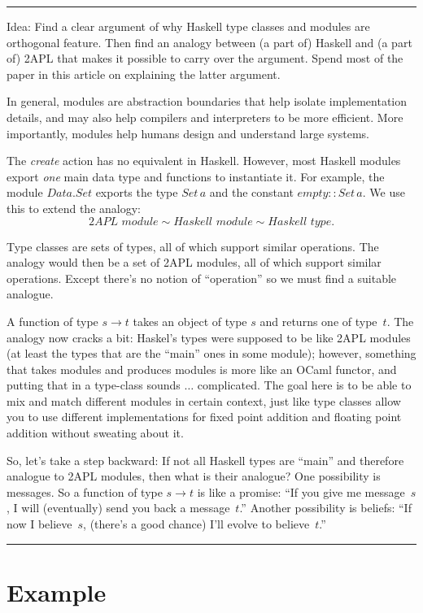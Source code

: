 \documentclass[conference,compsoc]{IEEEtran} %
\newenvironment{notes}{\medskip\hrule\nobreak\smallskip\narrower}{\smallskip\hrule\medskip}
\begin{document}
\begin{notes}
Idea: Find a clear argument of why Haskell type classes and modules are
orthogonal feature. Then find an analogy between (a part of) Haskell and (a
part of) 2APL that makes it possible to carry over the argument. Spend most
of the paper in this article on explaining the latter argument.

In general, modules are abstraction boundaries that help isolate
implementation details, and may also help compilers and interpreters to be
more efficient.  More importantly, modules help humans design and
understand large systems.

The \textit{create} action has no equivalent in Haskell. However, most
Haskell modules export \emph{one} main data type and functions to
instantiate it. For example, the module $\mathit{Data}.\mathit{Set}$
exports the type $\mathit{Set}\,a$ and the constant
$\mathit{empty}::\mathit{Set}\,a$.  We use this to extend the analogy: \[
\textit{2APL module} \sim \textit{Haskell module} \sim \textit{Haskell
type}. \]

Type classes are sets of types, all of which support similar operations.
The analogy would then be a set of 2APL modules, all of which support
similar operations. Except there's no notion of ``operation'' so we must
find a suitable analogue.

A function of type $s\to t$ takes an object of type $s$ and returns one of
type~$t$. The analogy now cracks a bit: Haskel's types were supposed to be
like 2APL modules (at least the types that are the ``main'' ones in some
module); however, something that takes modules and produces modules is more
like an OCaml functor, and putting that in a type-class sounds $\ldots$
complicated. The goal here is to be able to mix and match different modules
in certain context, just like type classes allow you to use different
implementations for fixed point addition and floating point addition
without sweating about it.

So, let's take a step backward: If not all Haskell types are ``main'' and
therefore analogue to 2APL modules, then what is their analogue? One
possibility is messages. So a function of type $s\to t$ is like a promise:
``If you give me message~$s$, I will (eventually) send you back a
message~$t$.'' Another possibility is beliefs: ``If now I believe~$s$,
(there's a good chance) I'll evolve to believe~$t$.''

\end{notes}

\section{Example} %
\end{document}
